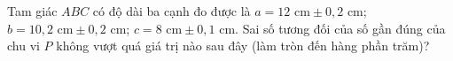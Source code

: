 \begin{ex}
Tam giác $ABC$ có độ dài ba cạnh đo được là $a=12\text{ cm}\pm0{,}2\text{ cm}$; $b=10{,}2\text{ cm}\pm0{,}2\text{ cm}$; $c=8\text{ cm}\pm0{,}1\text{ cm}$. Sai số tương đối của số gần đúng của chu vi $P$ không vượt quá giá trị nào sau đây (làm tròn đến hàng phần trăm)?
\end{ex}
